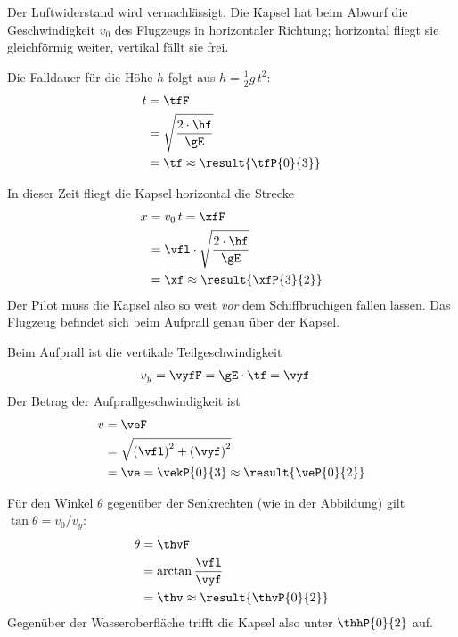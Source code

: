 Der Luftwiderstand wird vernachlässigt. Die Kapsel hat beim Abwurf die Geschwindigkeit $v_0$ des Flugzeugs in horizontaler Richtung; horizontal fliegt sie gleichförmig weiter, vertikal fällt sie frei.

\begin{abcliste}
\abc Die Falldauer für die Höhe $h$ folgt aus $h = \frac{1}{2}g\,t^2$:
\begin{align}
 t &= \tfF \\
   &= \sqrt{\frac{2\cdot\hf}{\gE}} \\
   &= \tf \approx \result{\tfP{0}{3}}
\end{align}

\abc In dieser Zeit fliegt die Kapsel horizontal die Strecke
\begin{align}
 x &= v_0\,t = \xfF \\
   &= \vfl\cdot\sqrt{\frac{2\cdot\hf}{\gE}} \\
   &= \xf \approx \result{\xfP{3}{2}}
\end{align}
Der Pilot muss die Kapsel also so weit \emph{vor} dem Schiffbrüchigen fallen lassen. Das Flugzeug befindet sich beim Aufprall genau über der Kapsel.

\abc Beim Aufprall ist die vertikale Teilgeschwindigkeit
\begin{align}
 v_y &= \vyfF = \gE\cdot\tf = \vyf
\end{align}
Der Betrag der Aufprallgeschwindigkeit ist
\begin{align}
 v &= \veF \\
   &= \sqrt{\left(\vfl\right)^2+\left(\vyf\right)^2} \\
   &= \ve = \vekP{0}{3} \approx \result{\veP{0}{2}}
\end{align}
\begin{center}
\end{center}
Für den Winkel $\theta$ gegenüber der Senkrechten (wie in der Abbildung) gilt $\tan\theta = v_0/v_y$:
\begin{align}
 \theta &= \thvF \\
   &= \arctan\frac{\vfl}{\vyf} \\
   &= \thv \approx \result{\thvP{0}{2}}
\end{align}
Gegenüber der Wasseroberfläche trifft die Kapsel also unter $\thhP{0}{2}$ auf.
\end{abcliste}

